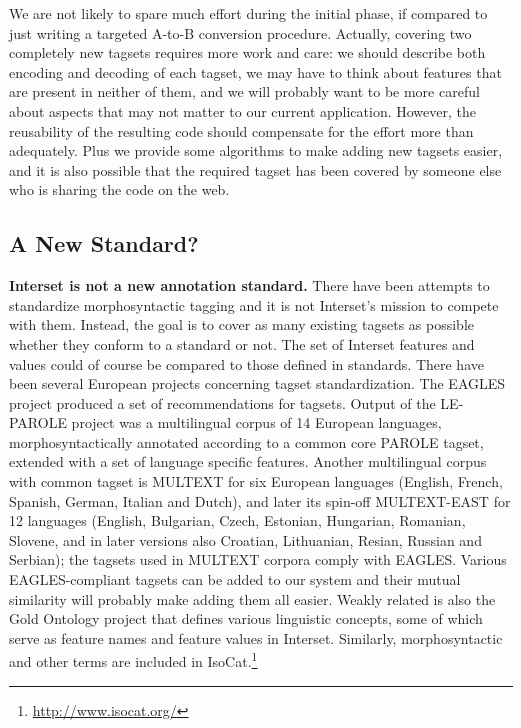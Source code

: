 \documentclass[11pt]{article}
\begin{document}
We are not likely to spare much effort during the initial phase, if compared to just writing a targeted A-to-B conversion procedure. Actually, covering two completely new tagsets requires more work and care: we should describe both encoding and decoding of each tagset, we may have to think about features that are present in neither of them, and we will probably want to be more careful about aspects that may not matter to our current application. However, the reusability of the resulting code should compensate for the effort more than adequately. Plus we provide some algorithms to make adding new tagsets easier, and it is also possible that the required tagset has been covered by someone else who is sharing the code on the web.

\subsection{A New Standard?}
\label{sec:notastandard}

\textbf{Interset is not a new annotation standard.} There have been attempts to standardize morphosyntactic tagging and it is not Interset's mission to compete with them. Instead, the goal is to cover as many existing tagsets as possible whether they conform to a standard or not. The set of Interset features and values could of course be compared to those defined in standards. There have been several European projects concerning tagset standardization. The EAGLES project \citep{eagles, LeechWilson1999} produced a set of recommendations for tagsets. Output of the LE-PAROLE project \citep{parole} was a multilingual corpus of 14 European languages, morphosyntactically annotated according to a common core PAROLE tagset, extended with a set of language specific features. Another multilingual corpus with common tagset is MULTEXT \citep{multext} for six European languages (English, French, Spanish, German, Italian and Dutch), and later its spin-off MULTEXT-EAST \citep{multext-east} for 12 languages (English, Bulgarian, Czech, Estonian, Hungarian, Romanian, Slovene, and in later versions also Croatian, Lithuanian, Resian, Russian and Serbian); the tagsets used in MULTEXT corpora comply with EAGLES. Various EAGLES-compliant tagsets can be added to our system and their mutual similarity will probably make adding them all easier. Weakly related is also the Gold Ontology project \citep{gold-ontology} that defines various linguistic concepts, some of which serve as feature names and feature values in Interset. Similarly, morphosyntactic and other terms are included in IsoCat.\footnote{\url{http://www.isocat.org/}}
\end{document}
